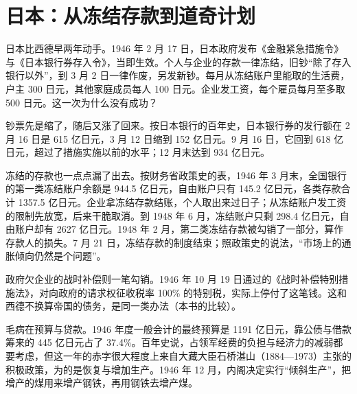 
\section{日本：从冻结存款到道奇计划}\label{sec:reconstruction-japan}

日本比西德早两年动手。1946 年 2 月 17 日，日本政府发布《金融紧急措施令》与《日本银行券存入令》，当即生效\cite{mof2010}。个人与企业的存款一律冻结，旧钞“除了存入银行以外”，到 3 月 2 日一律作废，另发新钞\cite{mof2010}。每月从冻结账户里能取的生活费，户主 300 日元，其他家庭成员每人 100 日元\cite{mof2010}。企业发工资，每个雇员每月至多取 500 日元\cite{mof2010}。这一次为什么没有成功？

钞票先是缩了，随后又涨了回来。按日本银行的百年史，日本银行券的发行额在 2 月 16 日是 615 亿日元，3 月 12 日缩到 152 亿日元\cite{boj1985}。9 月 16 日，它回到 618 亿日元，超过了措施实施以前的水平；12 月末达到 934 亿日元\cite{boj1985}。

冻结的存款也一点点漏了出去。按财务省政策史的表，1946 年 3 月末，全国银行的第一类冻结账户余额是 944.5 亿日元，自由账户只有 145.2 亿日元，各类存款合计 1357.5 亿日元\cite{mof2010}。企业拿冻结存款结账，个人取出来过日子；从冻结账户发工资的限制先放宽，后来干脆取消\cite{mof2010}。到 1948 年 6 月，冻结账户只剩 298.4 亿日元，自由账户却有 2627 亿日元\cite{mof2010}。1948 年 2 月，第二类冻结存款被勾销了一部分，算作存款人的损失\cite{mof2010}。7 月 21 日，冻结存款的制度结束；照政策史的说法，“市场上的通胀倾向仍然是个问题”\cite{mof2010}。

政府欠企业的战时补偿则一笔勾销。1946 年 10 月 19 日通过的《战时补偿特别措施法》，对向政府的请求权征收税率 100\% 的特别税，实际上停付了这笔钱\cite{mof2010}。这和西德不换算帝国的债务，是同一类办法（本书的比较）。

毛病在预算与贷款。1946 年度一般会计的最终预算是 1191 亿日元，靠公债与借款筹来的 445 亿日元占了 37.4\%\cite{boj1985}。百年史说，占领军经费的负担与经济力的减弱都要考虑，但这一年的赤字很大程度上来自大藏大臣石桥湛山（1884—1973）主张的积极政策，为的是恢复与增加生产\cite{boj1985,loc35}。1946 年 12 月，内阁决定实行“倾斜生产”，把增产的煤用来增产钢铁，再用钢铁去增产煤\cite{mof2010}。

